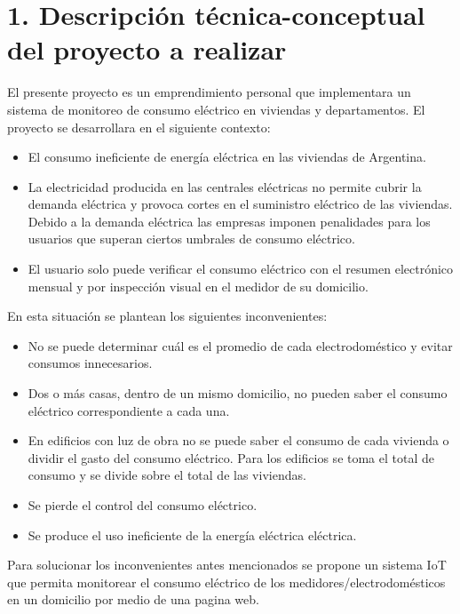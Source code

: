 \documentclass[
11pt, %
]{charter}
\begin{document}
\section{1. Descripción técnica-conceptual del proyecto a realizar}
\label{sec:descripcion}


El presente proyecto es un emprendimiento personal que implementara un sistema de monitoreo de consumo eléctrico en viviendas y departamentos.
El proyecto  se desarrollara en el siguiente contexto:

\begin{itemize}

	\item{El consumo ineficiente de energía eléctrica en las viviendas de Argentina.
	}
	\item{La electricidad producida en las centrales eléctricas no permite cubrir la demanda eléctrica y provoca cortes en el suministro eléctrico de las viviendas. Debido a la demanda eléctrica las empresas imponen penalidades para los usuarios que superan ciertos umbrales de consumo eléctrico.
	}
	\item{El usuario solo puede verificar el consumo eléctrico con el resumen electrónico mensual y por inspección visual en el medidor de su domicilio.
	}
\end{itemize}


En esta situación se plantean los siguientes inconvenientes:

\begin{itemize}

	\item{No se puede determinar cuál es el promedio de cada electrodoméstico y evitar consumos innecesarios.
	}
	\item{Dos o más casas, dentro de un mismo domicilio, no pueden saber el consumo eléctrico correspondiente a cada una.
	}
	\item{En edificios con luz de obra no se puede saber el consumo de cada vivienda o  dividir el gasto del consumo eléctrico. Para los edificios se toma el total de consumo y se divide sobre el total de las viviendas.
	}
	\item{Se pierde el control del consumo eléctrico.
	}
	\item{Se produce el uso ineficiente de la energía eléctrica eléctrica.
	}
\end{itemize}


Para solucionar los inconvenientes antes mencionados se propone un sistema IoT  que permita monitorear el consumo eléctrico de los medidores/electrodomésticos en un domicilio por medio de una pagina web.
\end{document}
